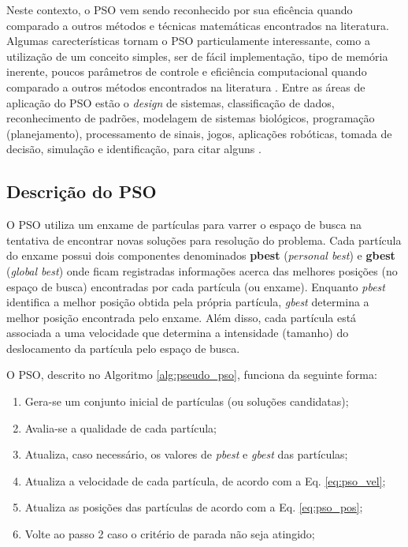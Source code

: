 \documentclass[
	12pt,				%
	openany,			%
	oneside,	
	a4paper,			%
	brazil,				%
	]{unimontes-ppgmsc-abntex2}
\begin{document}
Neste contexto, o PSO vem sendo reconhecido por sua eficência quando comparado a outros métodos e técnicas matemáticas encontrados na literatura. Algumas carecterísticas tornam o PSO particulamente interessante, como a utilização de um conceito simples, ser de fácil implementação, tipo de memória inerente, poucos parâmetros de controle e eficiência computacional quando comparado a outros métodos encontrados na literatura \cite{Valle_2008}. Entre as áreas de aplicação do PSO estão o {\em design} de sistemas, classificação de dados, reconhecimento de padrões, modelagem de sistemas biológicos, programação (planejamento), processamento de sinais, jogos, aplicações robóticas, tomada de decisão, simulação e identificação, para citar alguns \cite{Kennedy_2001}.
  

\subsection{Descrição do PSO}
\label{sec:desc_pso}

O PSO utiliza um enxame de partículas para varrer o espaço de busca na tentativa de encontrar novas soluções para resolução do problema. Cada partícula do enxame possui dois componentes denominados \textbf{pbest} ({\em personal best}) e \textbf{gbest} ({\em global best}) onde ficam registradas informações acerca das melhores posições (no espaço de busca) encontradas por cada partícula (ou enxame). Enquanto {\em pbest} identifica a melhor posição obtida pela própria partícula, {\em gbest} determina a melhor posição encontrada pelo enxame. Além disso, cada partícula está associada a uma velocidade que determina a intensidade (tamanho) do deslocamento da partícula pelo espaço de busca. 

O PSO, descrito no Algoritmo \ref{alg:pseudo_pso}, funciona da seguinte forma: 

\begin{enumerate}[label=\arabic*)]
\item Gera-se um conjunto inicial de partículas (ou soluções candidatas);
\item Avalia-se a qualidade de cada partícula;
\item Atualiza, caso necessário, os valores de {\em pbest} e {\em gbest} das partículas;
\item Atualiza a velocidade de cada partícula, de acordo com a Eq. \ref{eq:pso_vel};
\item Atualiza as posições das partículas de acordo com a Eq. \ref{eq:pso_pos};
\item Volte ao passo 2 caso o critério de parada não seja atingido;
\end{enumerate}
\end{document}
